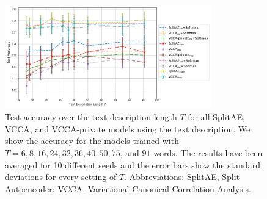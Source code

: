 
\begin{figure}[t]
    \centering
    \includegraphics[width=0.8\textwidth]{PaperB/figures_and_tables/varying_t_NEW2.png}
    \vspace{-2mm}
    \caption{Test accuracy over the text description length $T$ for all SplitAE, VCCA, and VCCA-private models using the text description. We show the accuracy for the models trained with $T = 6, 8, 16, 24, 32, 36, 40, 50, 75$, and $91$ words. The results have been averaged for 10 different seeds and the error bars show the standard deviations for every setting of $T$. Abbreviations: SplitAE, Split Autoencoder; VCCA, Variational Canonical Correlation Analysis.}
    \label{fig:varying_t}
    \vspace{-3mm}
\end{figure}